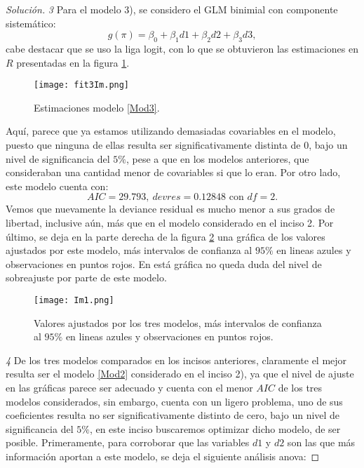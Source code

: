 \documentclass[10.5pt,notitlepage]{article}
\newenvironment{solucion}
  {\begin{proof}[Solución]}
  {\end{proof}}
\theoremstyle{plain}
\begin{document}
\begin{solucion}
\textit{3} Para el modelo 3), se considero el GLM binimial con componente sistemático:
\begin{equation}\label{Mod3}
    g(\pi) = \beta_0 + \beta_{1}d1+\beta_2 d2 + \beta_{3}d3,
\end{equation}
cabe destacar que se uso la liga logit, con lo que se obtuvieron las estimaciones en \(R\) presentadas en la figura \ref{fig3}.
\begin{figure}[htb]
    \centering
    \texttt{[image: fit3Im.png]}
    \caption{Estimaciones modelo \eqref{Mod3}.}
    \label{fig3}
\end{figure}
Aquí, parece que ya estamos utilizando demasiadas covariables en el modelo, puesto que ninguna de ellas resulta ser significativamente distinta de \(0\), bajo un nivel de significancia del \(5\%\), pese a que en los modelos anteriores, que consideraban una cantidad menor de covariables si que lo eran. Por otro lado, este modelo  cuenta con: 
\begin{equation}\label{AIC3}
    AIC = 29.793, \ devres = 0.12848 \text{ con } df = 2.  
\end{equation}
Vemos que nuevamente la deviance residual es mucho menor a sus grados de libertad, inclusive aún, más que en el modelo considerado en el inciso 2. Por último, se deja en la parte derecha de la figura \ref{figtodas} una gráfica de los valores ajustados por este modelo, más intervalos de confianza al \(95\%\) en lineas azules y observaciones en puntos rojos. En está gráfica no queda duda del nivel de sobreajuste por parte de este modelo. \\ 

\begin{figure}[htb]
    \centering
    \texttt{[image: Im1.png]}
    \caption{Valores ajustados por los tres modelos, más intervalos de confianza al \(95\%\) en lineas azules y observaciones en puntos rojos.}
    \label{figtodas}
\end{figure}

\textit{4} De los tres modelos comparados en los incisos anteriores, claramente el mejor resulta ser el modelo \eqref{Mod2} considerado en el inciso 2), ya que el nivel de ajuste en las gráficas parece ser adecuado y cuenta con el menor \(AIC\) de los tres modelos considerados, sin embargo, cuenta con un ligero problema, uno de sus coeficientes resulta no ser significativamente distinto de cero, bajo un nivel de significancia del \(5\%\), en este inciso buscaremos optimizar dicho modelo, de ser posible. Primeramente, para corroborar que las variables \(d1\) y \(d2\) son las que más información aportan a este modelo, se deja el siguiente análisis anova: 


\end{solucion}
\end{document}
